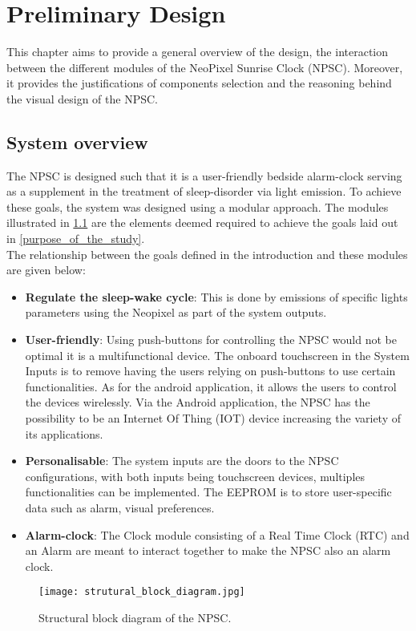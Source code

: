 \chapter{Preliminary Design}

This chapter aims to provide a general overview of the design, the interaction between the different modules of the NeoPixel Sunrise Clock (NPSC). Moreover, it provides the justifications of components selection and the reasoning behind the visual design of the NPSC.

\section{System overview}\label{system_overview}
The NPSC is designed such that it is a user-friendly bedside alarm-clock serving as a supplement in the treatment of sleep-disorder via light emission. To achieve these goals, the system was designed using a modular approach. The modules illustrated in  \cref{fig:strutural_block_diagram} are the elements deemed required to achieve the goals laid out in \ref{purpose_of_the_study}. \\
The relationship between the goals defined in the introduction and these modules are given below:
\begin{itemize}
\item \textbf{Regulate the sleep-wake cycle}: This is done by emissions of specific lights parameters using the Neopixel as part of the system outputs.
\item \textbf{User-friendly}: Using push-buttons for controlling the NPSC would not be optimal it is a multifunctional device. The onboard touchscreen in the System Inputs is to remove having the users relying on push-buttons to use certain functionalities. As for the android application, it allows the users to control the devices wirelessly. Via the Android application, the NPSC has the possibility to be an Internet Of Thing (IOT) device increasing the variety of its applications.
\item \textbf{Personalisable}: The system inputs are the doors to the NPSC configurations, with both inputs being touchscreen devices, multiples functionalities can be implemented. The EEPROM is to store user-specific data such as alarm, visual preferences.
\item \textbf{Alarm-clock}: The Clock module consisting of a Real Time Clock (RTC) and an Alarm are meant to interact together to make the NPSC also an alarm clock.
\end{itemize}
\begin{figure}[ht]
\centering
\texttt{[image: strutural\_block\_diagram.jpg]}
\caption{Structural block diagram of the NPSC.}
\label{fig:strutural_block_diagram}
\end{figure}


